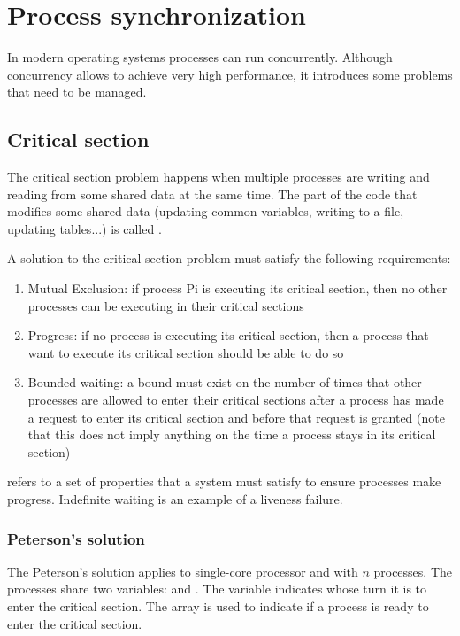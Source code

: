 \chapter{Process synchronization}

In modern operating systems processes can run concurrently. Although concurrency allows to achieve very high performance, it introduces some problems that need to be managed.

\section{Critical section}
The critical section problem happens when multiple processes are writing and reading from some shared data at the same time. The part of the code that modifies some shared data (updating common variables, writing to a file, updating tables...) is called .

A solution to the critical section problem must satisfy the following requirements:
\begin{enumerate}
    \item Mutual Exclusion: if process Pi is executing its critical section, then no other processes can be executing in their critical sections
    \item Progress: if no process is executing its critical section, then a process that want to execute its critical section should be able to do so
    \item Bounded waiting: a bound must exist on the number of times that other processes are allowed to enter their critical sections after a process has made a request to enter its critical section and before that request is granted (note that this does not imply anything on the time a process stays in its critical section)
\end{enumerate}

 refers to a set of properties that a system must satisfy to ensure processes make progress. Indefinite waiting is an example of a liveness failure.

\subsection{Peterson's solution}
The Peterson's solution applies to single-core processor and with $n$ processes. The processes share two variables:  and . The  variable indicates whose turn it is to enter the critical section. The  array is used to indicate if a process is ready to enter the critical section.


